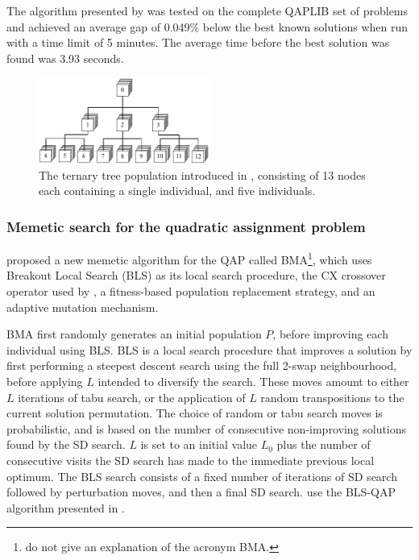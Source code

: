{{    	The algorithm presented by \citeauthor{Harris:2015kw} was tested on the complete QAPLIB set of problems and achieved an average gap of 0.049\% below the best known solutions when run with a time limit of 5 minutes. The average time before the best solution was found was 3.93 seconds.

    	\begin{figure}
    		\centering
    		\includegraphics[width=0.5\textwidth]{figures/ternary-tree.pdf}%
    		\caption{The ternary tree population introduced in \citet{Inostroza:2008md}, consisting of 13 nodes each containing a single  individual, and five  individuals.}
    		\label{fig:ternary-tree}
    	\end{figure}
    }


    \subsubsection*{Memetic search for the quadratic assignment problem} {
    	\citet{Benlic:2015gp} proposed a new memetic algorithm for the QAP called BMA\footnote{\citeauthor{Benlic:2015gp} do not give an explanation of the acronym BMA.}, which uses Breakout Local Search (BLS) as its local search procedure, the CX crossover operator used by \citet{Merz:2000ek}, a fitness-based population replacement strategy, and an adaptive mutation mechanism.

    	BMA first randomly generates an initial population \(P\), before improving each individual using BLS.
    	BLS is a local search procedure that improves a solution by first performing a steepest descent search using the full 2-swap neighbourhood, before applying \(L\)  intended to diversify the search. These moves amount to either \(L\) iterations of tabu search, or the application of \(L\) random transpositions to the current solution permutation. The choice of random or tabu search moves is probabilistic, and is based on the number of consecutive non-improving solutions found by the SD search. \(L\) is set to an initial value \(L_0\) plus the number of consecutive visits the SD search has made to the immediate previous local optimum.
    	The BLS search consists of a fixed number of iterations of SD search followed by perturbation moves, and then a final SD search.
    	\citeauthor{Benlic:2015gp} use the BLS-QAP algorithm presented in \citet{Benlic:2013gi}.

}}
